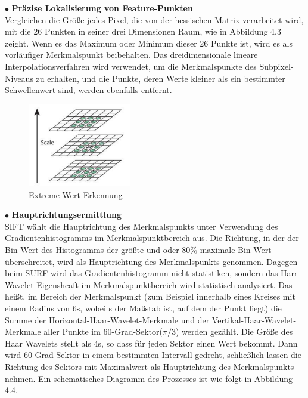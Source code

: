$\bullet$ \textbf{Präzise Lokalisierung von Feature-Punkten}\\
Vergleichen die Größe jedes Pixel, die von der hessischen Matrix verarbeitet wird, mit die 26 Punkten in seiner drei Dimensionen Raum, wie in Abbildung 4.3 zeight. Wenn es das Maximum oder Minimum dieser 26 Punkte ist, wird es als vorläufiger Merkmalspunkt beibehalten. Das dreidimensionale lineare Interpolationsverfahren wird verwendet, um die Merkmalspunkte des Subpixel-Niveaus zu erhalten, und die Punkte, deren Werte kleiner als ein bestimmter Schwellenwert sind, werden ebenfalls entfernt.

\begin{figure}[htb]
 \centering 
 \includegraphics[keepaspectratio,width=0.4\textwidth]{images/4_ZweiteErfahrung/Extreme_Wert_Erkennung.pdf}
 \caption{Extreme Wert Erkennung}
 \label{fig:Extreme Wert Erkennung}
\end{figure} 


$\bullet$ \textbf{Hauptrichtungsermittlung}\\
SIFT wählt die Hauptrichtung des Merkmalspunkts unter Verwendung des Gradientenhistogramms im Merkmalspunktbereich aus. Die Richtung, in der der Bin-Wert des Histogramms der größte und oder 80\% maximale Bin-Wert  überschreitet, wird als Hauptrichtung des Merkmalspunkts genommen. Dagegen beim SURF wird das Gradientenhistogramm nicht statistiken, sondern das Harr-Wavelet-Eigenshcaft im Merkmalspunktbereich wird statistisch analysiert. Das heißt, im Bereich der Merkmalspunkt (zum Beispiel innerhalb eines Kreises mit einem Radius von 6s, wobei s der Maßstab ist, auf dem der Punkt liegt) die Summe der Horizontal-Haar-Wavelet-Merkmale und der Vertikal-Haar-Wavelet-Merkmale aller Punkte im  60-Grad-Sektor($\pi/3$) werden gezählt. Die Größe des Haar Wavelets stellt als 4s, so dass für jeden Sektor einen Wert bekommt. Dann wird 60-Grad-Sektor in einem bestimmten Intervall gedreht, schließlich lassen die Richtung des Sektors mit Maximalwert als Hauptrichtung des Merkmalspunkts nehmen. Ein schematisches Diagramm des Prozesses ist wie folgt in Abbildung 4.4.

